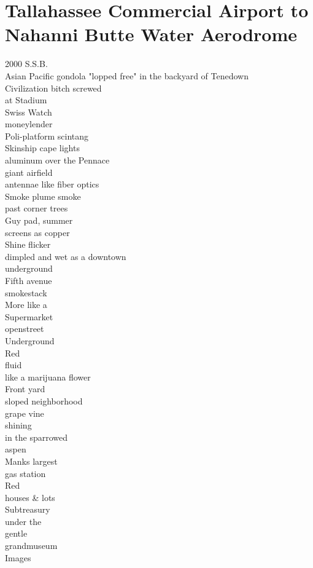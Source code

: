 \documentclass[smalldemyvopaper,11pt,twoside,onecolumn,openright,extrafontsizes]{memoir}
\begin{document}
\chapter{Tallahassee Commercial Airport to Nahanni Butte Water Aerodrome}
2000 S.S.B.
\\Asian Pacific gondola "lopped free" in the backyard of Tenedown
\\Civilization bitch screwed
\\at Stadium
\\Swiss Watch
\\moneylender
\\Poli-platform scintang
\\Skinship cape lights
\\aluminum over the Pennace
\\giant airfield
\\antennae like fiber optics
\\Smoke plume smoke
\\past corner trees
\\Guy pad, summer
\\screens as copper
\\Shine flicker
\\dimpled and wet as a downtown
\\underground
\\Fifth avenue
\\smokestack
\\More like a
\\Supermarket
\\openstreet
\\Underground
\\Red
\\fluid
\\like a marijuana flower
\\Front yard
\\sloped neighborhood
\\grape vine
\\shining
\\in the sparrowed
\\aspen
\\Manks largest
\\gas station
\\Red
\\houses \& lots
\\Subtreasury
\\under the
\\gentle
\\grandmuseum
\\Images
\end{document}

